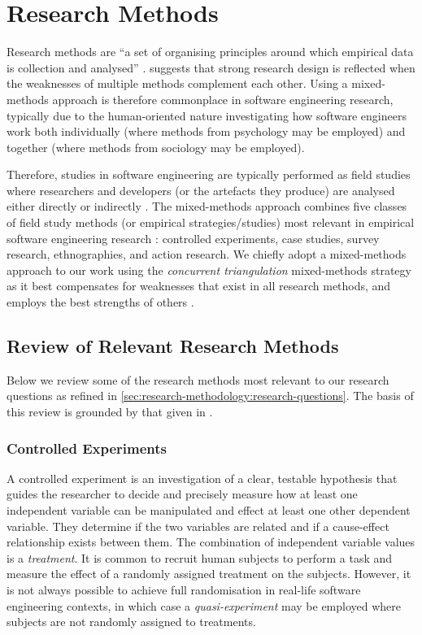 \section{Research Methods}
\label{sec:research-methodology:review}

Research methods are ``a set of organising principles around which empirical data is collection and analysed'' \citep{Easterbrook:2007ws}. \citet{Creswell:2017vn} suggests that strong research design is reflected when the weaknesses of multiple methods complement each other. Using a mixed-methods approach is therefore commonplace in software engineering research, typically due to the human-oriented nature investigating how software engineers work both individually (where methods from psychology may be employed) and together (where methods from sociology may be employed).

Therefore, studies in software engineering are typically performed as field studies where researchers and developers (or the artefacts they produce) are analysed either directly or indirectly \citep{Singer:2007tu}. The mixed-methods approach combines five classes of field study methods (or empirical strategies/studies) most relevant in empirical software engineering research \citep{Easterbrook:2007ws, Wohlin:2012bu, Juristo:2013vj}: controlled experiments, case studies, survey research, ethnographies, and action research. We chiefly adopt a mixed-methods approach to our work using the \textit{concurrent triangulation} mixed-methods strategy \citep{Jick:1979el} as it best compensates for weaknesses that exist in all research methods, and employs the best strengths of others \citep{Creswell:2017vn}.

\subsection{Review of Relevant Research Methods}
\label{ssec:research-methodology:review:methods}

Below we review some of the research methods most relevant to our research questions as refined in \cref{sec:research-methodology:research-questions}. The basis of this review is grounded by that given in \citet{Easterbrook:2007ws}.

\subsubsection{Controlled Experiments}
A controlled experiment is an investigation of a clear, testable hypothesis that guides the researcher to decide and precisely measure how at least one independent variable can be manipulated and effect at least one other dependent variable. They determine if the two variables are related and if a cause-effect relationship exists between them. The combination of independent variable values is a \textit{treatment}. It is common to recruit human subjects to perform a task and measure the effect of a randomly assigned treatment on the subjects. However, it is not always possible to achieve full randomisation in real-life software engineering contexts, in which case a \textit{quasi-experiment} may be employed where subjects are not randomly assigned to treatments.

